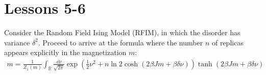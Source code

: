 \documentclass[../template.tex]{subfiles}
\begin{document}
\chapter{Lessons 5-6}

\begin{exo}
    Consider the Random Field Ising Model (RFIM), in which the disorder has variance $\delta^2$. Proceed to arrive at the formula where the number $n$ of replicas appears explicitly in the magnetization $m$:
    \begin{align*}
        m = \frac{1}{Z_1(m)} \int_{\mathbb{R}} \frac{\dd{\nu}}{\sqrt{2 \pi}} \exp\left(\frac{1}{2} \nu^2 + n\ln 2 \cosh(2 \beta J m + \beta \delta \nu)  \right)   \tanh(2 \beta Jm + \beta \delta \nu)
    \end{align*}

    \medskip


\end{exo}
\end{document}
